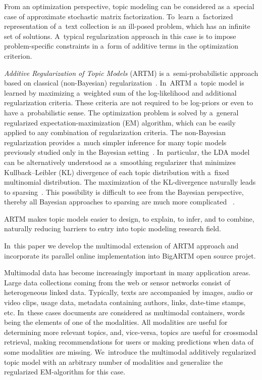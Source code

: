 \documentclass{sig-alternate-2013}
\begin{document}
From an optimization perspective,
topic modeling can be considered as a~special case
of approximate stochastic matrix factorization.
To~learn a~factorized representation of a~text collection
is an ill-posed problem, which has an infinite set of solutions.
A~typical regularization approach in this case is
to impose problem-specific constraints
in a~form of additive terms in the optimization criterion.

\emph{Additive Regularization of Topic Models} (ARTM)
is a~semi-probabilistic approach based on classical (non-Bayesian) regularization~\cite{voron14dan-eng}.
In~ARTM a~topic model is learned by maximizing a~weighted sum
of the log-likelihood and additional regularization criteria.
These criteria are not required to be log-priors or even to have a~probabilistic sense.
The optimization problem is solved by a~general regularized expectation-maximization (EM) algorithm,
which can be easily applied to any combination of regularization criteria.
The non-Bayesian regularization provides a~much simpler inference
for many topic models previously studied only in the Bayesian setting~\cite{voron14aist,voron14mlj}.
In~particular,
the LDA model can be alternatively understood as a~smoothing regularizer
that minimizes Kullback--Leibler (KL) divergence
of each topic distribution with a~fixed multinomial distribution.
The maximization of the KL-divergence naturally leads to sparsing~\cite{voron14aist}.
This possibility is difficult to see from the Bayesian perspective,
thereby all Bayesian approaches to sparsing are much more complicated~%
\cite{shashanka07sparse,wang09decoupling,ugander11concave,eisenstein11sparse,chien13bayesian}.

ARTM makes topic models easier to design, to explain, to infer, and to combine,
naturally reducing barriers to entry into topic modeling research field.

In~this paper we develop the multimodal extension of ARTM approach
and incorporate its parallel online implementation into BigARTM open source projet.

Multimodal data has become increasingly important in many application areas.
Large data collections coming from the web or sensor networks
consist of heterogeneous linked data.
Typically, texts are accompanied by images, audio or video clips, usage data,
metadata containing authors, links, date-time stamps, etc.
In~these cases documents are considered as multimodal containers,
words being the elements of one of the modalities.
All modalities are useful for determining more relevant topics,
and, vice-versa,
topics are useful for crossmodal retrieval,
making recommendations for users or
making predictions when data of some modalities are missing.
We~introduce the multimodal additively regularized topic model
with an arbitrary number of modalities
and generalize the regularized EM-algorithm for this case.
\end{document}

